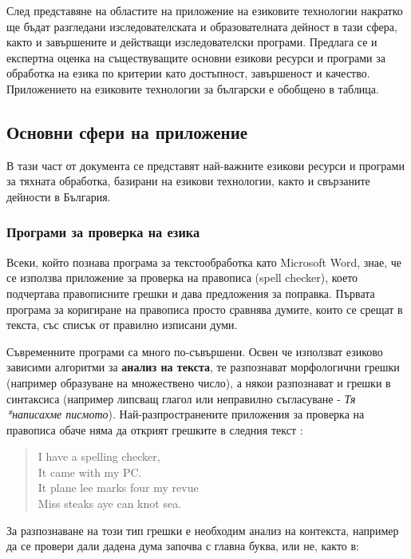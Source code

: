 \documentclass[]{../../metanetpaper}
\begin{document}
\begin{multicols}{2}
След представяне на областите на приложение на езиковите технологии накратко ще бъдат разгледани изследователската и образователната дейност в тази сфера, както и завършените и действащи изследователски програми. Предлага се  и експертна оценка на съществуващите основни езикови ресурси и програми за обработка на езика по критерии като достъпност, завършеност и качество. Приложението на езиковите технологии за български е обобщено в таблица.

\subsection{Основни сфери на приложение}

В тази част от документа се представят най-важните езикови ресурси и програми за тяхната обработка, базирани на езикови технологии, както и свързаните дейности в България. 

\subsubsection{Програми за проверка на езика}

Всеки, който познава програма за текстообработка като Microsoft Word, знае, че се използва приложение за проверка на правописа (spell checker), което подчертава правописните грешки и дава предложения за поправка. Първата програма за коригиране на правописа просто сравнява думите, които се срещат в текста, със списък от правилно изписани думи. 

Съвременните програми са много по-съвършени. Освен че използват
езиково зависими алгоритми за \textbf{анализ на текста}, те разпознават
морфологични грешки (например образуване на множествено число), а
някои разпознават и грешки в синтаксиса (например липсващ глагол или
неправилно съгласуване - {\it Тя *написахме
  писмото}). Най-разпространените приложения за проверка на правописа
обаче няма да открият грешките в следния текст \cite{zar1}: 

\begin{quote}
  I have a spelling checker,\\
  It came with my PC.\\
  It plane lee marks four my revue\\
  Miss steaks aye can knot sea.
\end{quote}

За разпознаване на този тип грешки е необходим анализ на контекста, например да се провери дали дадена дума започва с главна буква, или не, както в: 


\end{multicols}
\end{document}
